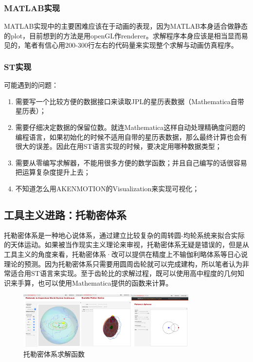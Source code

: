 \documentclass{ctexart}
\theoremstyle{definition}
\begin{document}
         \subsubsection{MATLAB实现}
            MATLAB实现中的主要困难应该在于动画的表现，因为MATLAB本身适合做静态的plot，目前想到的方法是用openGL作renderer。求解程序本身应该是相当显而易见的，笔者有信心用200-300行左右的代码量来实现整个求解与动画仿真程序。
            
        \subsubsection{ST实现}
            可能遇到的问题：
            \begin{enumerate}
                \item 需要写一个比较方便的数据接口来读取JPL的星历表数据（Mathematica自带星历表）；
                \item 需要仔细决定数据的保留位数。就连Mathematica这样自动处理精确度问题的编程语言，如果初始化的时候不适用自带的星历表数据，那么最终计算也会有很大的误差。因此在用ST语言实现的时候，要决定用哪种数据类型；
                \item 需要从零编写求解器，不能用很多方便的数学函数；并且自己编写的话很容易把运算复杂度提升上去；
                \item 不知道怎么用AKENMOTION的Visualization来实现可视化；
            \end{enumerate}
            
        
    \subsection{工具主义进路：托勒密体系}
        托勒密体系是一种地心说体系，通过建立比较复杂的周转圆-均轮系统来拟合实际的天体运动。如果被当作现实主义理论来审视，托勒密体系无疑是错误的，但是从工具主义的角度来看，托勒密体系·改可以提供在精度上不输伽利略体系等日心说理论的预测。因为托勒密体系只需要用圆周齿轮就可以完成建构，所以笔者认为非常适合用ST语言来实现。至于齿轮比的求解过程，既可以使用高中程度的几何知识来手算，也可以使用Mathematica提供的函数来计算。
        \begin{figure}[h]
                \centering
                \includegraphics[width=0.80\textwidth]{Ptolemy_3.png}
                \caption{\label{fig:Ptolemy}托勒密体系求解函数}
            \end{figure}
        
\printbibliography[heading=bibintoc, title={参考书目}]
 
\end{document}
